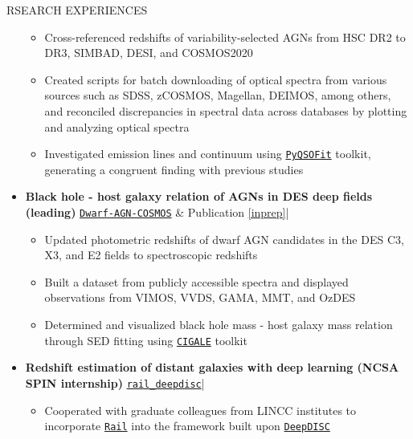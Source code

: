 \documentclass[10pt]{article} %
\begin{document}
\begin{section}{RSEARCH EXPERIENCES}
\begin{itemize}[leftmargin=1.5em]
    \begin{itemize}[leftmargin=1.5em]
        \item Cross-referenced redshifts of variability-selected AGNs from HSC DR2 to DR3, SIMBAD, DESI, and COSMOS2020
        \item Created scripts for batch downloading of optical spectra from various sources such as SDSS, zCOSMOS, Magellan, DEIMOS, among others, and reconciled discrepancies in spectral data across databases by plotting and analyzing optical spectra
        \item Investigated emission lines and continuum using \href{https://github.com/legolason/PyQSOFit}{\texttt{PyQSOFit}} toolkit, generating a congruent finding with previous studies
    \end{itemize}
    \item \textbf{Black hole - host galaxy relation of AGNs in DES deep fields (leading)} 
    \hfill {\footnotesize \href{https://github.com/burke86/dwarf_agn_cosmos}{\texttt{Dwarf-AGN-COSMOS}} \& Publication \ref{inprep}}| %
    \begin{itemize}[leftmargin=1.5em]
        \item Updated photometric redshifts of dwarf AGN candidates in the DES C3, X3, and E2 fields to spectroscopic redshifts
        \item Built a dataset from publicly accessible spectra and displayed observations from VIMOS, VVDS, GAMA, MMT, and OzDES
        \item Determined and visualized black hole mass - host galaxy mass relation through SED fitting using \href{https://cigale.lam.fr/}{\texttt{CIGALE}} toolkit
    \end{itemize}
    \item \textbf{Redshift estimation of distant galaxies with deep learning (NCSA SPIN internship)} 
    \hfill {\footnotesize \href{https://github.com/LSSTDESC/rail_deepdisc}{\texttt{rail\_deepdisc}}}| %
    \begin{itemize}[leftmargin=1.5em]
        \item Cooperated with graduate colleagues from LINCC institutes to incorporate \href{https://github.com/LSSTDESC/RAIL}{\texttt{Rail}} into the framework built upon \href{https://github.com/burke86/deepdisc}{\texttt{DeepDISC}}
    \end{itemize}
\end{itemize}


\end{section}
\end{document}
